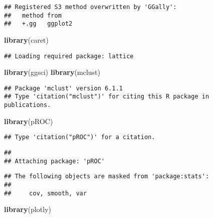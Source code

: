 \documentclass[
]{article}
\newenvironment{Shaded}{\begin{snugshade}}{\end{snugshade}}
\newcommand{\FunctionTok}[1]{\textcolor[rgb]{0.13,0.29,0.53}{\textbf{#1}}}
\newcommand{\NormalTok}[1]{#1}
\begin{document}
\begin{verbatim}
## Registered S3 method overwritten by 'GGally':
##   method from   
##   +.gg   ggplot2
\end{verbatim}

\begin{Shaded}
\begin{Highlighting}[]
\FunctionTok{library}\NormalTok{(caret)}
\end{Highlighting}
\end{Shaded}

\begin{verbatim}
## Loading required package: lattice
\end{verbatim}

\begin{Shaded}
\begin{Highlighting}[]
\FunctionTok{library}\NormalTok{(ggsci)}
\FunctionTok{library}\NormalTok{(mclust)}
\end{Highlighting}
\end{Shaded}

\begin{verbatim}
## Package 'mclust' version 6.1.1
## Type 'citation("mclust")' for citing this R package in publications.
\end{verbatim}

\begin{Shaded}
\begin{Highlighting}[]
\FunctionTok{library}\NormalTok{(pROC)}
\end{Highlighting}
\end{Shaded}

\begin{verbatim}
## Type 'citation("pROC")' for a citation.
\end{verbatim}

\begin{verbatim}
## 
## Attaching package: 'pROC'
\end{verbatim}

\begin{verbatim}
## The following objects are masked from 'package:stats':
## 
##     cov, smooth, var
\end{verbatim}

\begin{Shaded}
\begin{Highlighting}[]
\FunctionTok{library}\NormalTok{(plotly)}
\end{Highlighting}
\end{Shaded}
\end{document}
